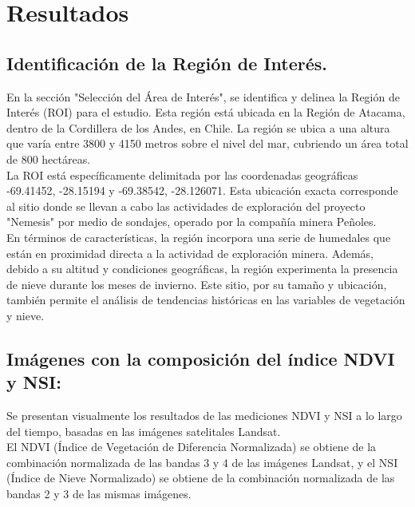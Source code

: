 \maketitle
\section{Resultados}
\subsection{\textbf{Identificación de la Región de Interés.}}
En la sección "Selección del Área de Interés", se identifica y delinea la Región de Interés (ROI) para el estudio. Esta región está ubicada en la Región de Atacama, dentro de la Cordillera de los Andes, en Chile. La región se ubica a una altura que varía entre 3800 y 4150 metros sobre el nivel del mar, cubriendo un área total de 800 hectáreas.\\

La ROI está específicamente delimitada por las coordenadas geográficas -69.41452, -28.15194 y -69.38542, -28.126071. Esta ubicación exacta corresponde al sitio donde se llevan a cabo las actividades de exploración del proyecto "Nemesis" por medio de sondajes, operado por la compañía minera Peñoles.\\

En términos de características, la región incorpora una serie de humedales que están en proximidad directa a la actividad de exploración minera. Además, debido a su altitud y condiciones geográficas, la región experimenta la presencia de nieve durante los meses de invierno. Este sitio, por su tamaño y ubicación, también permite el análisis de tendencias históricas en las variables de vegetación y nieve.\\

\subsection{\textbf{Imágenes con la composición del índice NDVI y NSI:}}
Se presentan visualmente los resultados de las mediciones NDVI y NSI a lo largo del tiempo, basadas en las imágenes satelitales Landsat.\\

El NDVI (Índice de Vegetación de Diferencia Normalizada) se obtiene de la combinación normalizada de las bandas 3 y 4 de las imágenes Landsat, y el NSI (Índice de Nieve Normalizado) se obtiene de la combinación normalizada de las bandas 2 y 3 de las mismas imágenes.\\

